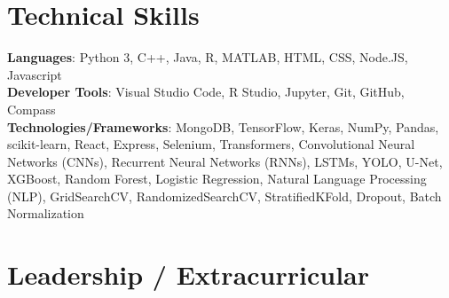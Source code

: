 \documentclass[letterpaper,11pt]{article}
\newcommand{\resumeSubHeadingListStart}{\begin{itemize}[leftmargin=0.0in, label={}]}
\newcommand{\resumeSubHeadingListEnd}{\end{itemize}}
\begin{document}
\section{Technical Skills}
\begin{itemize}[leftmargin=0.15in, label={}]
    \small{\item{
     \textbf{Languages}{: Python 3, C++, Java, R, MATLAB, HTML, CSS, Node.JS, Javascript} \\
     \textbf{Developer Tools}{: Visual Studio Code, R Studio, Jupyter, Git, GitHub, Compass} \\
     \textbf{Technologies/Frameworks}{: MongoDB, TensorFlow, Keras, NumPy, Pandas, scikit-learn, React, Express, Selenium, Transformers, Convolutional Neural Networks (CNNs), Recurrent Neural Networks (RNNs), LSTMs, YOLO, U-Net, XGBoost, Random Forest, Logistic Regression, Natural Language Processing (NLP), GridSearchCV, RandomizedSearchCV, StratifiedKFold, Dropout, Batch Normalization} \\
    }}
\end{itemize}

\section{Leadership / Extracurricular}
\resumeSubHeadingListStart
\resumeSubHeadingListEnd
\end{document}
